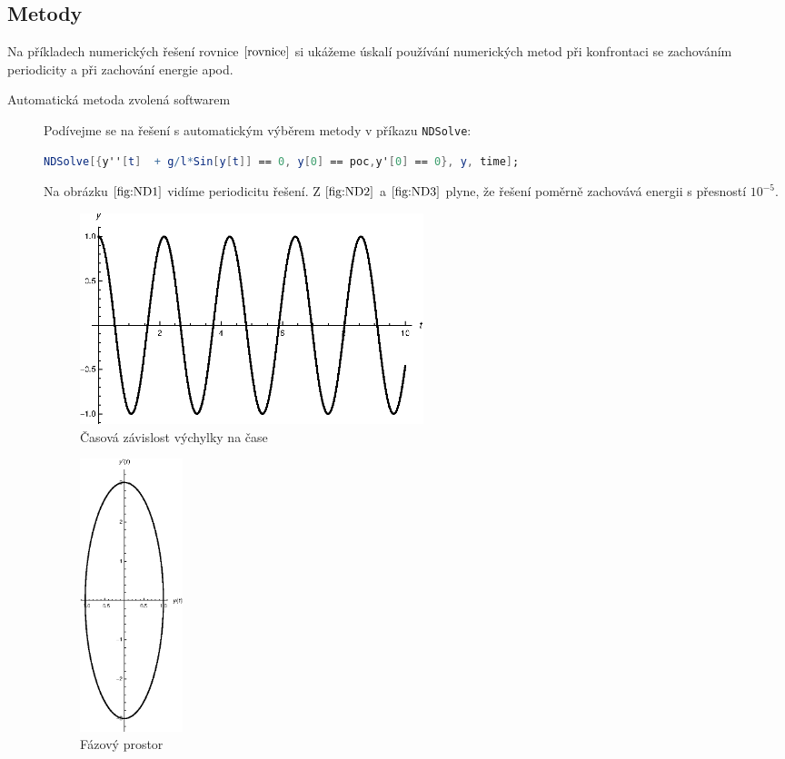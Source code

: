 \subsection{Metody}
\label{sec:Metody}

Na příkladech numerických řešení rovnice $\eqref{rovnice}$ si ukážeme úskalí používání numerických metod při konfrontaci se zachováním periodicity a při zachování energie apod. 

\begin{description}
\item[Automatická metoda zvolená softwarem] Podívejme se na řešení s automatickým výběrem metody v příkazu \texttt{NDSolve}:

\begin{lstlisting}[language=Mathematica]
NDSolve[{y''[t]  + g/l*Sin[y[t]] == 0, y[0] == poc,y'[0] == 0}, y, time];
\end{lstlisting}

Na obrázku $\eqref{fig:ND1}$ vidíme periodicitu řešení. Z $\eqref{fig:ND2}$ a $\eqref{fig:ND3}$ plyne, že řešení poměrně zachovává energii s přesností $10^{-5}$.

\begin{figure}[h]
  \centering
  \includegraphics[width=10cm]{figures/ND1.eps}
  \caption{Časová závislost výchylky na čase}
  \label{fig:ND1}
\end{figure}

\begin{figure}[h]
  \centering
  \includegraphics[width=3cm]{figures/ND2.eps}
  \caption{Fázový prostor}
  \label{fig:ND2}
\end{figure}


\end{description}
